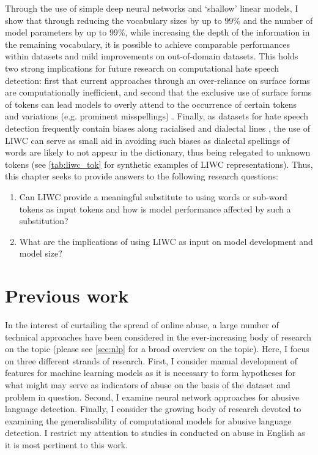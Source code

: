 Through the use of simple deep neural networks and `shallow' linear models, I show that through reducing the vocabulary sizes by up to $99\%$ and the number of model parameters by up to $99\%$, while increasing the depth of the information in the remaining vocabulary, it is possible to achieve comparable performances within datasets and mild improvements on out-of-domain datasets. This holds two strong implications for future research on computational hate speech detection: first that current approaches through an over-reliance on surface forms are computationally inefficient, and second that the exclusive use of surface forms of tokens can lead models to overly attend to the occurrence of certain tokens and variations (e.g. prominent misspellings) \citep{Rottger:2021}. Finally, as datasets for hate speech detection frequently contain biases along racialised and dialectal lines \citep{Waseem:2018,Davidson:2019}, the use of LIWC can serve as small aid in avoiding such biases as dialectal spellings of words are likely to not appear in the dictionary, thus being relegated to unknown tokens (see \autoref{tab:liwc_tok} for synthetic examples of LIWC representations). Thus, this chapter seeks to provide answers to the following research questions:

\begin{enumerate}[start=1, label={(RQ \arabic*):}]
  \item{Can LIWC provide a meaningful substitute to using words or sub-word tokens as input tokens and how is model performance affected by such a substitution?}
  \item{What are the implications of using LIWC as input on model development and model size?}
\end{enumerate}

\section{Previous work}

In the interest of curtailing the spread of online abuse, a large number of technical approaches have been considered in the ever-increasing body of research on the topic (please see \autoref{sec:nlp} for a broad overview on the topic). Here, I focus on three different strands of research. First, I consider manual development of features for machine learning models as it is necessary to form hypotheses for what might may serve as indicators of abuse on the basis of the dataset and problem in question. Second, I examine neural network approaches for abusive language detection. Finally, I consider the growing body of research devoted to examining the generalisability of computational models for abusive language detection. I restrict my attention to studies in conducted on abuse in English as it is most pertinent to this work.

